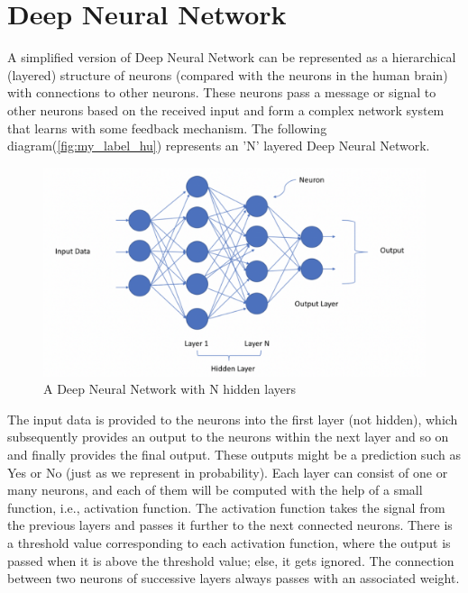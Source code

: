 \section{Deep Neural Network}


A simplified version of Deep Neural Network can be represented as a hierarchical (layered) structure of neurons (compared with the neurons in the human brain) with connections to other neurons\cite{LeCun2015}. These neurons pass a message or signal to other neurons based on the received input and form a complex network system that learns with some feedback mechanism. The following diagram(\autoref{fig:my_label_hu}) represents an 'N' layered Deep Neural Network.\\

\begin{figure}[H]
    \centering
    \includegraphics[scale=0.4]{Figure/1_ML_report.png}
    \caption{A Deep Neural Network with N hidden layers}
    \label{fig:my_label_hu}
\end{figure}
The input data is provided to the neurons into the first layer (not hidden), which subsequently provides an output to the neurons within the next layer and so on and finally provides the final output. These outputs might be a prediction such as Yes or No (just as we represent in probability). Each layer can consist of one or many neurons, and each of them will be computed with the help of a small function, i.e., activation function. The activation function takes the signal from the previous layers and passes it further to the next connected neurons. There is a threshold value corresponding to each activation function, where the output is passed when it is above the threshold value; else, it gets ignored. The connection between two neurons of successive layers always passes with an associated weight. \\
 
